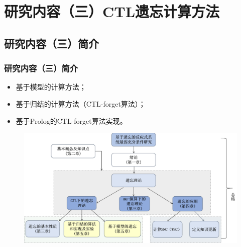 \documentclass[9pt, CJK]{beamer}
\begin{document}
\section{研究内容（三）CTL遗忘计算方法}
\subsection{研究内容（三）简介}
\begin{frame}
	\frametitle{研究内容（三）简介}
	\begin{itemize}
		\item 基于模型的计算方法；
		\item 基于归结的计算方法（CTL-forget算法）；
		\item 基于Prolog的CTL-forget算法实现。
	\end{itemize}
\begin{figure}
	\includegraphics[scale=0.3]{figures/frameF5}
\end{figure}
\end{frame}
\end{document}
